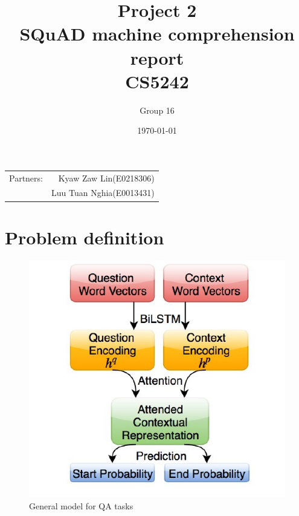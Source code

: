 \documentclass[paper=a4, fontsize=11pt]{scrartcl} %
\title{Project 2 \\ SQuAD machine comprehension report \\ CS5242} %
\author{Group 16} %
\date{\today} %
\begin{document}
\maketitle %

\begin{center}
\begin{tabular}{l r}
Partners: & Kyaw Zaw Lin(E0218306) \\ %
& Luu Tuan Nghia(E0013431) \\

\end{tabular}
\end{center}



\section{Problem definition}
\begin{figure}\centering
	\includegraphics[scale=0.2]{gen_model.jpg}
	\caption{General model for QA tasks}
	\label{fig:gen_model}
\end{figure}
\end{document}
